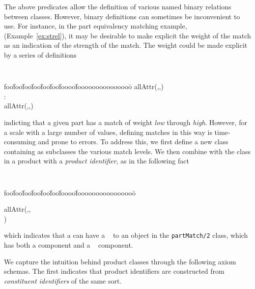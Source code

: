 The above predicates allow the definition of various named binary
relations between classes.  However, binary definitions can sometimes
be inconvenient to use.  For instance, in the part equivalency
matching example, (Example~\ref{ex:strel}), it may be desirable to
make explicit the weight of the match as an indication of the strength
of the match.  The weight could be made explicit by a series of
definitions
{\small 
{\tt 
\begin{tabbing}
foo\=foo\=foo\=foo\=foo\=foo\=foooo\=fooooooooooooooo\=\kill
\> allAttr(,,) \\
\> : \\
\> allAttr(,,)
\end{tabbing}
} } 
\noindent
indicting that a given part has a match of weight {\em low} through
{\em high}.  However, for a scale with a large number of values,
defining matches in this way is time-consuming and prone to errors.
To address this, we first define a new class {\tt {}}
containing as subclasses the various match levels.  We then combine
{\tt {}} with the class {\tt {}} in a
product with a {\em product identifier}, as in the following fact
{\small 
{\tt 
\begin{tabbing}
foo\=foo\=foo\=foo\=foo\=foo\=foooo\=foooooooooooooooo\=\kill
 
allAttr(,, \\
\> \> \> \> )
\end{tabbing}  } }
\noindent 
which indicates that a {\tt {}} can have a {\tt
{}} to an object in the {\tt partMatch/2}  class,
which has both a {\tt {}} component and a {\tt
{}} component.


We capture the intuition behind product classes through the following
axiom schemas.  The first indicates that product identifiers 
are constructed from {\em constituent identifiers} of the same sort.

